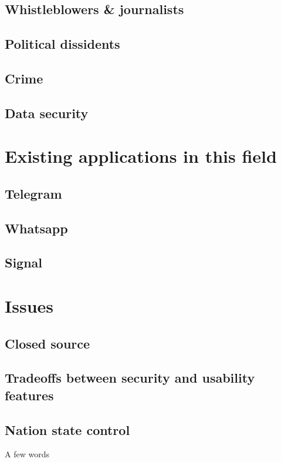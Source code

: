 \documentclass{mproj}
\begin{document}
\subsection{Whistleblowers \& journalists}

\subsection{Political dissidents}

\subsection{Crime}

\subsection{Data security}

\section{Existing applications in this field}

\subsection{Telegram}

\subsection{Whatsapp}

\subsection{Signal}

\section{Issues}

\subsection{Closed source}

\subsection{Tradeoffs between security and usability features}

\subsection{Nation state control}
A few words
\end{document}
